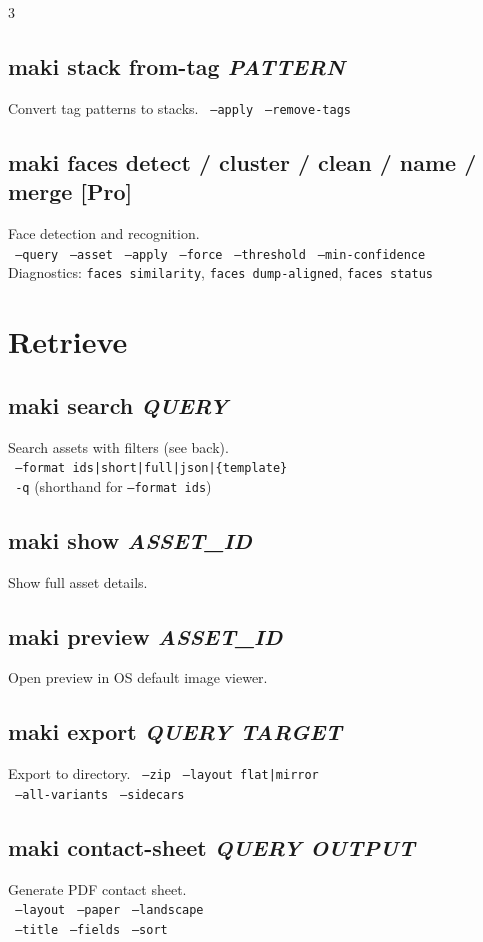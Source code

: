 \documentclass[a4paper,landscape,8pt]{article}
\newcommand{\cmd}[1]{\texttt{\footnotesize #1}}
\newcommand{\opt}[1]{\texttt{\scriptsize\color{maki-stone} #1}}
\newcommand{\pro}{\textcolor{maki-teal}{\scriptsize [Pro]}}
\begin{document}
\begin{multicols}{3}
\subsection{maki stack from-tag \textit{PATTERN}}
Convert tag patterns to stacks. \opt{--apply} \opt{--remove-tags}

\subsection{maki faces detect / cluster / clean / name / merge \pro}
Face detection and recognition. \\
\opt{--query} \opt{--asset} \opt{--apply} \opt{--force} \opt{--threshold} \opt{--min-confidence} \\
Diagnostics: \cmd{faces similarity}, \cmd{faces dump-aligned}, \cmd{faces status}

\section{Retrieve}

\subsection{maki search \textit{QUERY}}
Search assets with filters (see back). \\
\opt{--format ids|short|full|json|\{template\}} \\
\opt{-q} (shorthand for \cmd{--format ids})

\subsection{maki show \textit{ASSET\_ID}}
Show full asset details.

\subsection{maki preview \textit{ASSET\_ID}}
Open preview in OS default image viewer.

\subsection{maki export \textit{QUERY TARGET}}
Export to directory. \opt{--zip} \opt{--layout flat|mirror} \\
\opt{--all-variants} \opt{--sidecars}

\subsection{maki contact-sheet \textit{QUERY OUTPUT}}
Generate PDF contact sheet. \\
\opt{--layout} \opt{--paper} \opt{--landscape} \\
\opt{--title} \opt{--fields} \opt{--sort}


\end{multicols}
\end{document}

